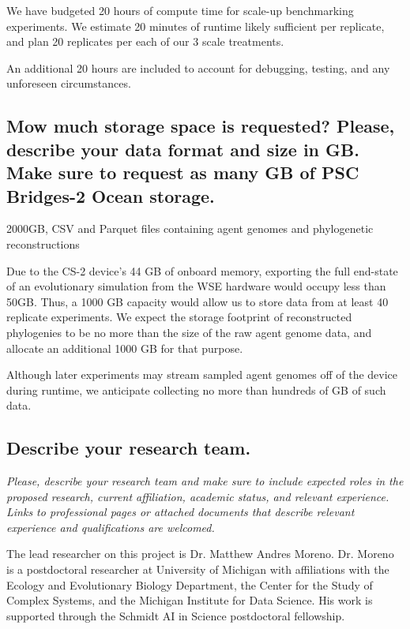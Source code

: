 We have budgeted 20 hours of compute time for scale-up benchmarking experiments.
We estimate 20 minutes of runtime likely sufficient per replicate, and plan 20 replicates per each of our 3 scale treatments.

An additional 20 hours are included to account for debugging, testing, and any unforeseen circumstances.

\subsection{Mow much storage space is requested? Please, describe your data format and size in GB. Make sure to request as many GB of PSC Bridges-2 Ocean storage.}

2000GB, CSV and Parquet files containing agent genomes and phylogenetic reconstructions

Due to the CS-2 device's 44 GB of onboard memory, exporting the full end-state of an evolutionary simulation from the WSE hardware would occupy less than 50GB.
Thus, a 1000 GB capacity would allow us to store data from at least 40 replicate experiments.
We expect the storage footprint of reconstructed phylogenies to be no more than the size of the raw agent genome data, and allocate an additional 1000 GB for that purpose.

Although later experiments may stream sampled agent genomes off of the device during runtime, we anticipate collecting no more than hundreds of GB of such data.

\subsection{Describe your research team.}

\begin{displayquote} \itshape
Please, describe your research team and make sure to include expected roles in the proposed research, current affiliation, academic status, and relevant experience.
Links to professional pages or attached documents that describe relevant experience and qualifications are welcomed.
\end{displayquote}

The lead researcher on this project is Dr. Matthew Andres Moreno.
Dr. Moreno is a postdoctoral researcher at University of Michigan with affiliations with the Ecology and Evolutionary Biology Department, the Center for the Study of Complex Systems, and the Michigan Institute for Data Science.
His work is supported through the Schmidt AI in Science postdoctoral fellowship.


